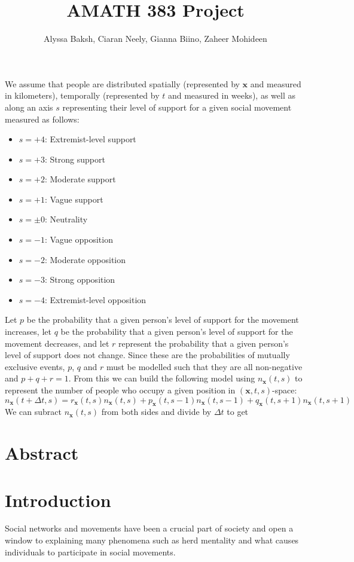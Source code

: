 \documentclass{article}
\title{AMATH 383 Project}
\author{
    Alyssa Baksh, 
    Ciaran Neely,
    Gianna Biino,
    Zaheer Mohideen
}
\begin{document}
    \maketitle

    

    We assume that people are distributed spatially (represented by $\bm x$ and measured in kilometers), temporally (represented by $t$ and measured in weeks), as well as along an axis $s$ representing their level of support for a given social movement measured as follows:
    \begin{itemize}
        \item $s=+4$: Extremist-level support
        \item $s=+3$: Strong support
        \item $s=+2$: Moderate support
        \item $s=+1$: Vague support
        \item $s=\pm 0$: Neutrality
        \item $s=-1$: Vague opposition
        \item $s=-2$: Moderate opposition
        \item $s=-3$: Strong opposition
        \item $s=-4$: Extremist-level opposition
    \end{itemize}
    Let $p$ be the probability that a given person's level of support for the movement increases, let $q$ be the probability that a given person's level of support for the movement decreases, and let $r$ represent the probability that a given person's level of support does not change. Since these are the probabilities of mutually exclusive events, $p$, $q$ and $r$ must be modelled such that they are all non-negative and $p+q+r=1$. From this we can build the following model using $n_{\bm x}(t,s)$ to represent the number of people who occupy a given position in $(\bm x, t, s)$-space:
    \[
        n_{\bm x}(t+\Delta t, s)=r_{\bm x}(t, s)n_{\bm x}(t, s)+p_{\bm x}(t, s-1)n_{\bm x}(t, s-1)+q_{\bm x}(t, s+1)n_{\bm x}(t, s+1)
    \]
    We can subract $n_{\bm x}(t,s)$ from both sides and divide by $\Delta t$ to get
    
    
    \section{Abstract}
    \section{Introduction}
    Social networks and movements have been a crucial part of society and open a window to explaining many phenomena such as herd mentality and what causes individuals to participate in social movements\cite{diani_networks_2013}.
    
\end{document}
